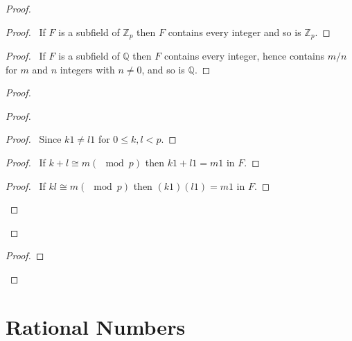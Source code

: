 \documentclass{article}
\let\qed\relax
\theoremstyle{definition}
\begin{document}
    \begin{proof}
        \pf
        \begin{proof}
            \pf\ If $F$ is a subfield of $\mathbb{Z}_p$ then $F$ contains every integer and so is $\mathbb{Z}_p$.
        \end{proof}
        \begin{proof}
            \pf\ If $F$ is a subfield of $\mathbb{Q}$ then $F$ contains every integer, hence contains $m/n$ for
            $m$ and $n$ integers with $n \neq 0$, and so is $\mathbb{Q}$.
        \end{proof}
        \begin{proof}
            \begin{proof}
                \begin{proof}
                    \pf\ Since $k1 \neq l1$ for $0 \leq k,l < p$.
                \end{proof}
                \begin{proof}
                    \pf\ If $k + l \cong m (\mod p)$ then $k1 + l1 = m1$ in $F$.
                \end{proof}
                \begin{proof}
                    \pf\ If $kl \cong m (\mod p)$ then $(k1)(l1) = m1$ in $F$.
                \end{proof}
            \end{proof}
        \end{proof}
        \begin{proof}
        \end{proof}
        \qed
    \end{proof}

    \section{Rational Numbers}
\end{document}
